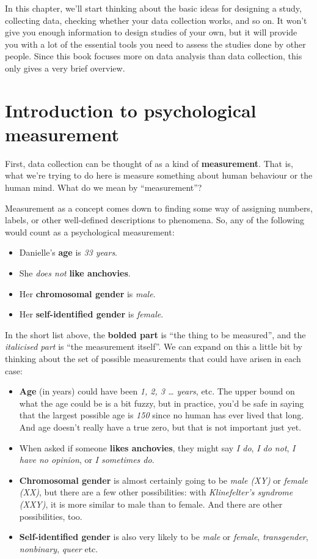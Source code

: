 \documentclass[
  11pt,
]{book}
\providecommand{\tightlist}{%
  \setlength{\itemsep}{0pt}\setlength{\parskip}{0pt}}
\theoremstyle{definition}
\theoremstyle{definition}
\theoremstyle{definition}
\theoremstyle{definition}
\theoremstyle{remark}
\begin{document}
In this chapter, we'll start thinking about the basic ideas for designing a study, collecting data, checking whether your data collection works, and so on. It won't give you enough information to design studies of your own, but it will provide you with a lot of the essential tools you need to assess the studies done by other people. Since this book focuses more on data analysis than data collection, this only gives a very brief overview.

\hypertarget{measurement}{%
\section{Introduction to psychological measurement}\label{measurement}}

First, data collection can be thought of as a kind of \textbf{measurement}. That is, what we're trying to do here is measure something about human behaviour or the human mind. What do we mean by ``measurement''?

Measurement as a concept comes down to finding some way of assigning numbers, labels, or other well-defined descriptions to phenomena. So, any of the following would count as a psychological measurement:

\begin{itemize}
\tightlist
\item
  Danielle's \textbf{age} is \emph{33 years}.
\item
  She \emph{does not} \textbf{like anchovies}.
\item
  Her \textbf{chromosomal gender} is \emph{male}.
\item
  Her \textbf{self-identified gender} is \emph{female}.
\end{itemize}

In the short list above, the \textbf{bolded part} is ``the thing to be measured'', and the \emph{italicised part} is ``the measurement itself''. We can expand on this a little bit by thinking about the set of possible measurements that could have arisen in each case:

\begin{itemize}
\tightlist
\item
  \textbf{Age} (in years) could have been \emph{1, 2, 3 \ldots{} years}, etc. The upper bound on what the age could be is a bit fuzzy, but in practice, you'd be safe in saying that the largest possible age is \emph{150} since no human has ever lived that long. And age doesn't really have a true zero, but that is not important just yet.
\item
  When asked if someone \textbf{likes anchovies}, they might say \emph{I do}, \emph{I do not}, \emph{I have no opinion}, or \emph{I sometimes do}.
\item
  \textbf{Chromosomal gender} is almost certainly going to be \emph{male (XY)} or \emph{female (XX)}, but there are a few other possibilities: with \emph{Klinefelter's syndrome (XXY)}, it is more similar to male than to female. And there are other possibilities, too.
\item
  \textbf{Self-identified gender} is also very likely to be \emph{male} or \emph{female}, \emph{transgender}, \emph{nonbinary}, \emph{queer} etc.
\end{itemize}
\end{document}
